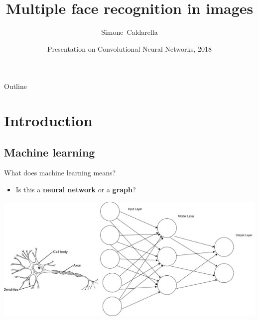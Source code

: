\documentclass{beamer}
\title[Face recognition]
{Multiple face recognition in images}
\author[Simone Caldarella]
{Simone~Caldarella }
\institute[University of Brescia] 
{
  	IEEE Student Branch Brescia\\
  	University of Brescia
}
\date[IEEE Student Branch 2018] 
{
	Presentation on Convolutional Neural Networks, 2018
}
\begin{document}
\begin{frame}
 	\titlepage
\end{frame}

\begin{frame}{Outline}
	\begin{multicols}{2}
  		\tableofcontents
	\end{multicols}
\end{frame}

\section{Introduction}

\subsection{Machine learning}

\begin{frame}{What does machine learning means?}
	\begin{itemize}
		[triangle]
  		\item
    			Is this a \textbf{neural network} or a \textbf{graph}?
	\end{itemize}
	\includegraphics[scale=0.5]{neuralNet}
\end{frame}
\end{document}
